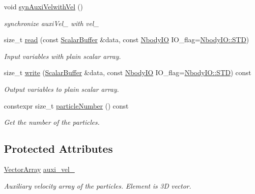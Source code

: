\begin{DoxyCompactItemize}
void \mbox{\hyperlink{class_space_h_1_1_vel_dep_particles_a5eb56f88aeb302c96e9fe1bcde1fad2f}{syn\+Auxi\+Velwith\+Vel}} ()
\begin{DoxyCompactList}\small\item\em synchronize auxi\+Vel\+\_\+ with vel\+\_\+ \end{DoxyCompactList}\item 
size\+\_\+t \mbox{\hyperlink{class_space_h_1_1_vel_dep_particles_a8bcbe3fac720dc62485e08f5098cb477}{read}} (const \mbox{\hyperlink{class_space_h_1_1_vel_indep_particles_abca40159a816385790d5a6fd19c1dc6d}{Scalar\+Buffer}} \&data, const \mbox{\hyperlink{namespace_space_h_a296a8bae763a754564bfdce216e31b59}{Nbody\+IO}} I\+O\+\_\+flag=\mbox{\hyperlink{namespace_space_h_a296a8bae763a754564bfdce216e31b59ac6ce23be5d350ce18a665427d2d950f7}{Nbody\+I\+O\+::\+S\+TD}})
\begin{DoxyCompactList}\small\item\em Input variables with plain scalar array. \end{DoxyCompactList}\item 
size\+\_\+t \mbox{\hyperlink{class_space_h_1_1_vel_dep_particles_acc81391b5d6d8344769eaee9b2b5096c}{write}} (\mbox{\hyperlink{class_space_h_1_1_vel_indep_particles_abca40159a816385790d5a6fd19c1dc6d}{Scalar\+Buffer}} \&data, const \mbox{\hyperlink{namespace_space_h_a296a8bae763a754564bfdce216e31b59}{Nbody\+IO}} I\+O\+\_\+flag=\mbox{\hyperlink{namespace_space_h_a296a8bae763a754564bfdce216e31b59ac6ce23be5d350ce18a665427d2d950f7}{Nbody\+I\+O\+::\+S\+TD}}) const
\begin{DoxyCompactList}\small\item\em Output variables to plain scalar array. \end{DoxyCompactList}\item 
constexpr size\+\_\+t \mbox{\hyperlink{class_space_h_1_1_vel_dep_particles_a12c9a60ac96d922444e337b95749c806}{particle\+Number}} () const
\begin{DoxyCompactList}\small\item\em Get the number of the particles. \end{DoxyCompactList}\end{DoxyCompactItemize}
\subsection*{Protected Attributes}
\begin{DoxyCompactItemize}
\item 
\mbox{\hyperlink{class_space_h_1_1_vel_indep_particles_aa9983058940249df8b00fa800e8cbad2}{Vector\+Array}} \mbox{\hyperlink{class_space_h_1_1_vel_dep_particles_afad94e7b131f91c60ff1775fe85ce05a}{auxi\+\_\+vel\+\_\+}}
\begin{DoxyCompactList}\small\item\em Auxiliary velocity array of the particles. Element is 3D vector. \end{DoxyCompactList}\end{DoxyCompactItemize}
